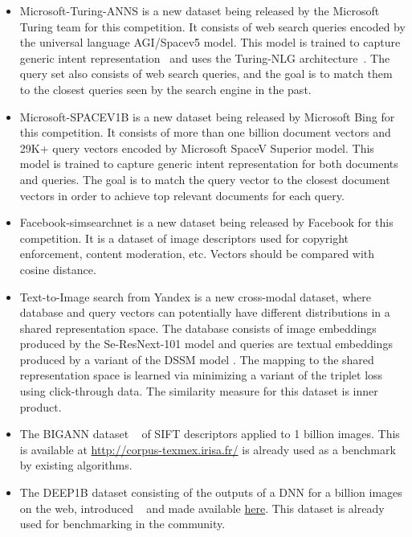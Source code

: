 
\begin{itemize}
  \item Microsoft-Turing-ANNS is a new dataset being released by the
    Microsoft Turing team for this competition. It consists of web
    search queries encoded by the universal language AGI/Spacev5
    model. This model is trained to capture generic intent
    representation~\cite{AGIv4} and uses the Turing-NLG
    architecture~\cite{Turing-NLG}. The query set also consists of web
    search queries, and the goal is to match them to the closest
    queries seen by the search engine in the past.
  \item Microsoft-SPACEV1B is a new dataset being released by
    Microsoft Bing for this competition. It consists of more than one
    billion document vectors and 29K+ query vectors encoded by
    Microsoft SpaceV Superior model. This model is trained to capture
    generic intent representation for both documents and queries. The
    goal is to match the query vector to the closest document vectors
    in order to achieve top relevant documents for each query.
  \item Facebook-simsearchnet is a new dataset being released by
    Facebook for this competition. It is a dataset of image descriptors 
    used for copyright enforcement, content moderation, etc.
    Vectors should be compared with cosine distance.
  \item Text-to-Image search from Yandex is a new cross-modal dataset,
    where database and query vectors can potentially have different
    distributions in a shared representation space. The database
    consists of image embeddings produced by the Se-ResNext-101 model
    \cite{hu2018squeeze} and queries are textual embeddings produced
    by a variant of the DSSM model \cite{huang2013learning}. The
    mapping to the shared representation space is learned via
    minimizing a variant of the triplet loss using click-through data. The similarity measure for this dataset is inner product.
  \item The BIGANN dataset ~\cite{SIFT1B} of SIFT descriptors applied
    to 1 billion images. This is available at
    \url{http://corpus-texmex.irisa.fr/} is already used as a
    benchmark by existing algorithms. 
  \item The DEEP1B dataset consisting of the outputs of a DNN for a
    billion images on the web, introduced ~\cite{deep1b-link} and made
    available
    \href{https://github.com/arbabenko/GNOIMI/blob/master/downloadDeep1B.py}{here}. This
    dataset is already used for benchmarking in the community.
\end{itemize}

